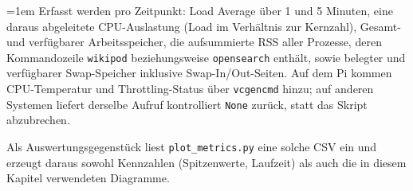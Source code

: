 \begingroup
\emergencystretch=1em
Erfasst werden pro Zeitpunkt: Load Average über 1 und 5 Minuten, eine daraus abgeleitete CPU-Auslastung (Load im Verhältnis zur Kernzahl), 
Gesamt- und verfügbarer Arbeitsspeicher, die aufsummierte RSS aller Prozesse, deren Kommandozeile \texttt{wikipod} beziehungsweise 
\texttt{opensearch} enthält, sowie belegter und verfügbarer Swap-Speicher inklusive Swap-In/Out-Seiten. Auf dem Pi kommen CPU-Temperatur 
und Throttling-Status über \texttt{vcgencmd} hinzu; auf anderen Systemen liefert derselbe Aufruf kontrolliert \texttt{None} zurück, statt 
das Skript abzubrechen.\par
\endgroup

Als Auswertungsgegenstück liest \texttt{plot\_metrics.py} eine solche CSV ein und erzeugt daraus sowohl Kennzahlen (Spitzenwerte, Laufzeit) als 
auch die in diesem Kapitel verwendeten Diagramme.